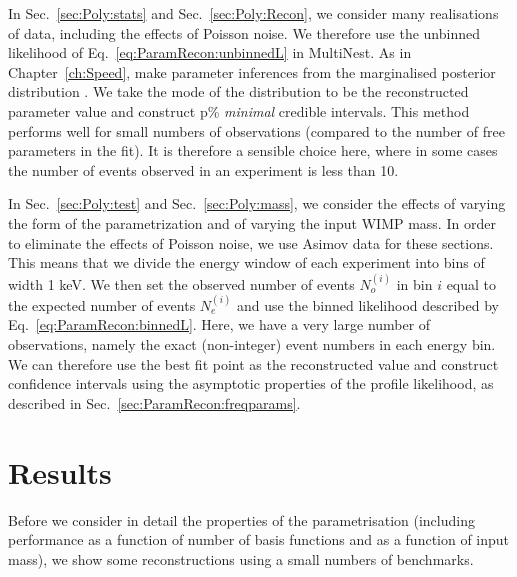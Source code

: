 In Sec.~\ref{sec:Poly:stats} and Sec.~\ref{sec:Poly:Recon}, we consider many realisations of data, including the effects of Poisson noise. We therefore use the unbinned likelihood of Eq.~\ref{eq:ParamRecon:unbinnedL} in MultiNest. As in Chapter~\ref{ch:Speed}, make parameter inferences from the marginalised posterior distribution . We take the mode of the distribution to be the reconstructed parameter value and construct p\% \textit{minimal} credible intervals. This method performs well for small numbers of observations (compared to the number of free parameters in the fit). It is therefore a sensible choice here, where in some cases the number of events observed in an experiment is less than 10. 

In Sec.~\ref{sec:Poly:test} and Sec.~\ref{sec:Poly:mass}, we consider the effects of varying the form of the parametrization and of varying the input WIMP mass. In order to eliminate the effects of Poisson noise, we use Asimov data \cite{Cowan:2013} for these sections. This means that we divide the energy window of each experiment into bins of width 1 keV. We then set the observed number of events $N_{o}^{(i)}$ in bin $i$ equal to the expected number of events $N_{e}^{(i)}$ and use the binned likelihood described by Eq.~\ref{eq:ParamRecon:binnedL}. Here, we have a very large number of observations, namely the exact (non-integer) event numbers in each energy bin. We can therefore use the best fit point as the reconstructed value and construct confidence intervals using the asymptotic properties of the profile likelihood, as described in Sec.~\ref{sec:ParamRecon:freqparams}.
 
\section{Results}



Before we consider in detail the properties of the parametrisation (including performance as a function of number of basis functions and as a function of input mass), we show some reconstructions using a small numbers of benchmarks. 


